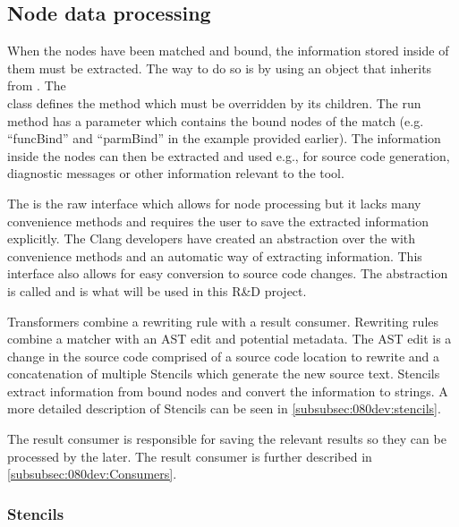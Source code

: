 \subsection{Node data processing} \label{subsec:080dev:NodeDataProcessing}

When the nodes have been matched and bound, the information stored inside of them must be extracted. The way to do so is by using an object that inherits from .
The \\ class defines the  method which must be overridden by its children. The run method has a  parameter which contains the bound nodes of the match (e.g. ``funcBind'' and ``parmBind'' in the example provided earlier).
The information inside the nodes can then be extracted and used e.g., for source code generation, diagnostic messages or other information relevant to the tool.

The  is the raw interface which allows for node processing but it lacks many convenience methods and requires the user to save the extracted information explicitly. The Clang developers have created an abstraction over the  with convenience methods and an automatic way of extracting information. This interface also allows for easy conversion to source code changes. The abstraction is called  and is what will be used in this R\&D project.

Transformers combine a rewriting rule with a result consumer. Rewriting rules combine a matcher with an AST edit and potential metadata. The AST edit is a change in the source code comprised of a source code location to rewrite and a concatenation of multiple Stencils which generate the new source text. Stencils extract information from bound nodes and convert the information to strings. A more detailed description of Stencils can be seen in \cref{subsubsec:080dev:stencils}.

The result consumer is responsible for saving the relevant results so they can be processed by the  later. The result consumer is further described in \cref{subsubsec:080dev:Consumers}.

\subsubsection*{Stencils} \label{subsubsec:080dev:stencils}


